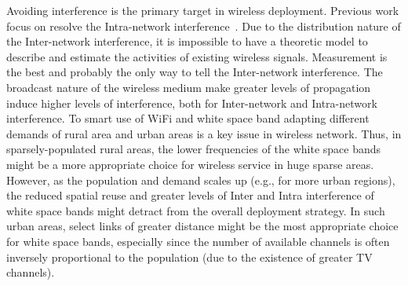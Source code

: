 Avoiding interference is the primary target in wireless deployment.
Previous work focus on resolve the Intra-network 
interference~\cite{subramanian2008minimum,ramachandran2006interference,si2010overview}.
Due to the distribution nature of the Inter-network interference,
it is impossible to have a theoretic model to describe and estimate the activities of existing
 wireless signals. Measurement is the best and probably the only way to tell the Inter-network
  interference. The broadcast nature of the wireless medium make greater levels of propagation 
  induce higher levels of interference, both for Inter-network
and Intra-network interference. To smart use of WiFi and white space band adapting different 
demands of rural area and urban areas is a key issue in wireless network. 
Thus, in sparsely-populated rural areas, the lower frequencies of the white space 
bands might be a more appropriate choice for wireless service in huge sparse areas. 
However, as the population and demand scales up (e.g., 
for more urban regions), the reduced spatial reuse and greater levels of Inter and Intra interference 
of white space bands might detract from the overall deployment strategy. In 
such urban areas, select links of greater distance might be the most 
appropriate choice for white space bands, especially since the number of 
available channels is often inversely proportional to the population (due 
to the existence of greater TV channels).


